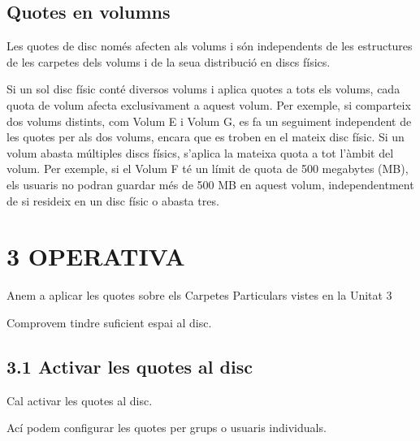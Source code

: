 \documentclass[
  a4paper,
]{article}
\begin{document}
\subsection{Quotes en volumns}\label{quotes-en-volumns}

Les quotes de disc només afecten als volums i són independents de les
estructures de les carpetes dels volums i de la seua distribució en
discs físics.

Si un sol disc físic conté diversos volums i aplica quotes a tots els
volums, cada quota de volum afecta exclusivament a aquest volum. Per
exemple, si comparteix dos volums distints, com Volum E i Volum G, es fa
un seguiment independent de les quotes per als dos volums, encara que es
troben en el mateix disc físic. Si un volum abasta múltiples discs
físics, s'aplica la mateixa quota a tot l'àmbit del volum. Per exemple,
si el Volum F té un límit de quota de 500 megabytes (MB), els usuaris no
podran guardar més de 500 MB en aquest volum, independentment de si
resideix en un disc físic o abasta tres.

\section{3 OPERATIVA}\label{operativa}

Anem a aplicar les quotes sobre els Carpetes Particulars vistes en la
Unitat 3

Comprovem tindre suficient espai al disc.

\subsection{3.1 Activar les quotes al
disc}\label{activar-les-quotes-al-disc}

Cal activar les quotes al disc.

Ací podem configurar les quotes per grups o usuaris individuals.
\end{document}
